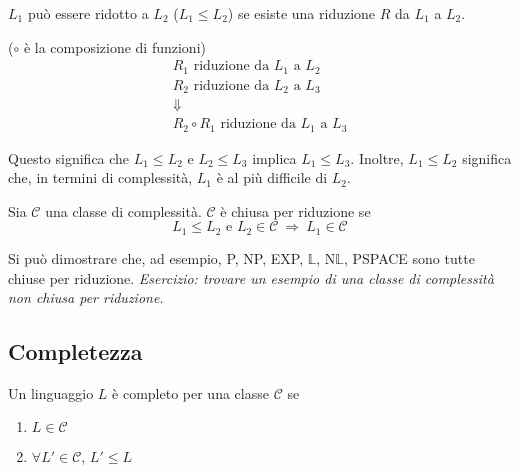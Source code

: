 \begin{definition}[$L_1\leq L_2$]
    $L_1$ può essere ridotto a $L_2$ ($L_1\leq L_2$) se esiste una riduzione $R$ da $L_1$ a $L_2$.
\end{definition}

\begin{property} ($\circ$ è la composizione di funzioni)
    \begin{eqnarray*}
        &R_1 \text{ riduzione da } L_1 \text{ a } L_2&\\
        &R_2 \text{ riduzione da } L_2 \text{ a } L_3&\\
        &\Downarrow&\\
        &R_2\circ R_1 \text{ riduzione da } L_1 \text{ a } L_3&
    \end{eqnarray*}
\end{property}
Questo significa che $L_1\leq L_2$ e $L_2\leq L_3$ implica $L_1\leq L_3$. Inoltre, $L_1\leq L_2$ significa che, in termini di complessità, $L_1$ è al più difficile di $L_2$.

\begin{definition}
    Sia $\mathcal{C}$ una classe di complessità. $\mathcal{C}$ è chiusa per riduzione se
    $$
        L_1\leq L_2 \text{ e } L_2\in\mathcal{C} ~\Rightarrow~ L_1\in\mathcal{C}
    $$
\end{definition}
Si può dimostrare che, ad esempio, P, NP, EXP, $\mathbb{L}$, N$\mathbb{L}$, PSPACE sono tutte chiuse per riduzione. \emph{Esercizio: trovare un esempio di una classe di complessità non chiusa per riduzione.}


\subsection{Completezza}

\begin{definition}
    Un linguaggio $L$ è completo per una classe $\mathcal{C}$ se
    \begin{enumerate}
        \item $L\in\mathcal{C}$
        \item $\forall L'\in\mathcal{C}$, $L'\leq L$
    \end{enumerate}    
\end{definition}

\begin{center}
\end{center}

